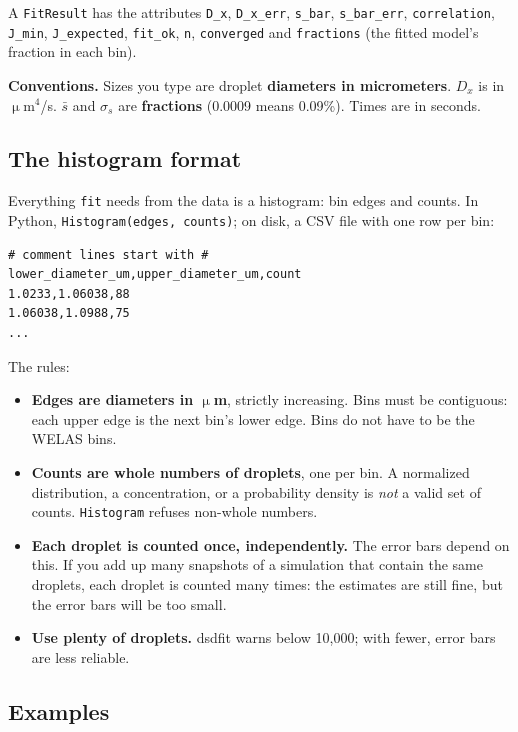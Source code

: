 \documentclass[11pt]{article}
\newcommand{\sbar}{\bar s}
\newcommand{\Dx}{D_x}
\newcommand{\code}[1]{\texttt{#1}}
\begin{document}
A \code{FitResult} has the attributes \code{D\_x}, \code{D\_x\_err}, \code{s\_bar}, \code{s\_bar\_err},
\code{correlation}, \code{J\_min}, \code{J\_expected}, \code{fit\_ok}, \code{n}, \code{converged} and
\code{fractions} (the fitted model's fraction in each bin).

\begin{notebox}
\textbf{Conventions.} Sizes you type are droplet \textbf{diameters in micrometers}. $\Dx$ is in
$\upmu$m$^4$/s. $\sbar$ and $\sigma_s$ are \textbf{fractions} (0.0009 means 0.09\%). Times are in seconds.
\end{notebox}

\subsection{The histogram format}\label{sec:format}

Everything \code{fit} needs from the data is a histogram: bin edges and counts. In Python,
\code{Histogram(edges, counts)}; on disk, a CSV file with one row per bin:
\begin{lstlisting}[language={}]
# comment lines start with #
lower_diameter_um,upper_diameter_um,count
1.0233,1.06038,88
1.06038,1.0988,75
...
\end{lstlisting}
The rules:
\begin{itemize}
\item \textbf{Edges are diameters in $\upmu$m}, strictly increasing. Bins must be contiguous: each upper edge
is the next bin's lower edge. Bins do not have to be the WELAS bins.
\item \textbf{Counts are whole numbers of droplets}, one per bin. A normalized distribution, a
concentration, or a probability density is \emph{not} a valid set of counts. \code{Histogram} refuses
non-whole numbers.
\item \textbf{Each droplet is counted once, independently.} The error bars depend on this. If you add up
many snapshots of a simulation that contain the same droplets, each droplet is counted many times: the
estimates are still fine, but the error bars will be too small.
\item \textbf{Use plenty of droplets.} dsdfit warns below 10{,}000; with fewer, error bars are less reliable.
\end{itemize}

\subsection{Examples}
\end{document}
